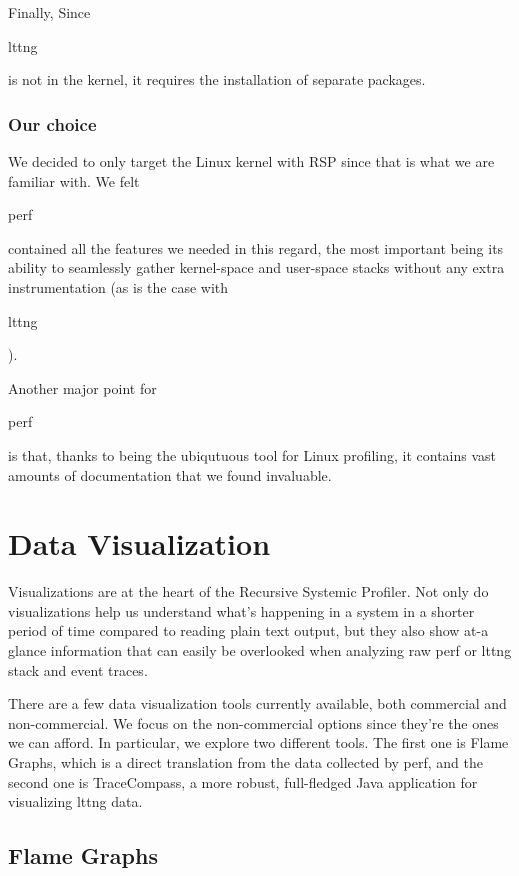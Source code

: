 \documentclass[10pt]{article}
\begin{document}
Finally, Since \begin{tt}lttng\end{tt} is not in the kernel, it requires the
installation of separate packages.

\subsubsection{Our choice}

We decided to only target the Linux kernel with RSP since that is what we are
familiar with. We felt \begin{tt}perf\end{tt} contained all the features we
needed in this regard, the most important being its ability to
seamlessly gather kernel-space and user-space stacks without any extra
instrumentation (as is the case with \begin{tt}lttng\end{tt}).

Another major point for \begin{tt}perf\end{tt} is that, thanks to being the
ubiqutuous tool for Linux profiling, it contains vast amounts of
documentation that we found invaluable.

\section{Data Visualization}

Visualizations are at the heart of the Recursive Systemic Profiler. Not only do
visualizations help us understand what's happening in a system in a shorter
period of time compared to reading plain text output, but they also show at-a
glance information that can easily be overlooked when analyzing raw perf or lttng
stack and event traces.

There are a few data visualization tools currently available, both commercial and
non-commercial. We focus on the non-commercial options since they're the ones we
can afford. In particular, we explore two different tools. The first one is Flame
Graphs, which is a direct translation from the data collected by perf, and the
second one is TraceCompass, a more robust, full-fledged Java application for
visualizing lttng data.

\subsection{Flame Graphs}
\end{document}
